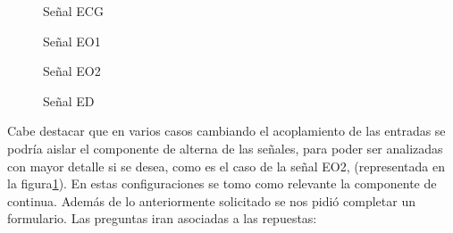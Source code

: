 \begin{figure}[H]
    \centering
    \begin{minipage}{0.49\textwidth}
    \centering
        
        \caption{Señal ECG}
    \end{minipage}
    \begin{minipage}{0.49\textwidth}
    \centering
        
        \caption{Señal EO1}
    \end{minipage}
\end{figure}
\begin{figure}[H]
    \centering
    \begin{minipage}{0.49\textwidth}
    \centering
        
        \caption{Señal EO2}
        \label{fig:EO2}
    \end{minipage}
    \begin{minipage}{0.49\textwidth}
    \centering
        
        \caption{Señal ED}
    \end{minipage}
\end{figure}
Cabe destacar que en varios casos cambiando el acoplamiento de las entradas se podría aislar el componente de alterna de las señales, para poder ser analizadas con mayor detalle si se desea, como es el caso de la señal EO2, (representada en la figura\ref{fig:EO2}). En estas configuraciones se tomo como relevante la componente de continua.
Además de lo anteriormente solicitado se nos pidió completar un formulario. Las preguntas iran asociadas a las repuestas:
